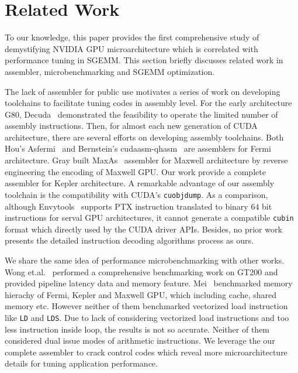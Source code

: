 \section{Related Work}
\label{sec:related}
To our knowledge, this paper provides the first comprehensive study of demystifying NVIDIA GPU microarchitecture which 
is correlated with performance tuning in SGEMM. This section briefly discusses related work in assembler, 
microbenchmarking and SGEMM optimization.

The lack of assembler for public use motivates a series of work on developing toolchains to facilitate tuning codes in 
assembly level. For the early architecture G80, Decuda~\cite{decuda} demonstrated the feasibility to operate the 
limited number of assembly instructions. Then, for almost each new generation of CUDA architecture, there are several 
efforts on developing assembly toolchains. Both Hou's Asfermi~\cite{asfermi} and Bernstein's 
cudaasm-qhasm~\cite{bernstein2012usable} are assemblers for Fermi architecture. Gray built MaxAs~\cite{maxas} assembler 
for Maxwell architecture by reverse engineering the encoding of Maxwell GPU. Our work provide a complete assembler for 
Kepler architecture. A remarkable advantage of our assembly toolchain is the compatibility with CUDA's {\tt cuobjdump}. 
As a comparison, although Envytools~\cite{envytools} supports PTX instruction translated to binary $64$ bit 
instructions for serval GPU architectures, it cannot generate a compatible {\tt cubin} format which directly used by 
the CUDA driver APIs. Besides, no prior work presents the detailed instruction decoding algorithms process as ours.

We share the same idea of performance microbenchmarking with other works. Wong et.al.~\cite{wong} performed a 
comprehensive benchmarking work on GT200 and provided pipeline latency data and
memory feature. Mei~\cite{mei} benchmarked memory hierachy
of Fermi, Kepler and Maxwell GPU, which including cache, shared memory etc. However neither of them benchmarked 
vectorized load instruction like {\tt LD} and {\tt LDS}. Due to lack of considering vectorized load instructions and 
too less instruction inside loop, the results is not so accurate. Neither of them considered dual issue modes of 
arithmetic instructions. We leverage the our complete assembler to crack control codes which reveal more 
microarchitecture details for tuning application performance.

